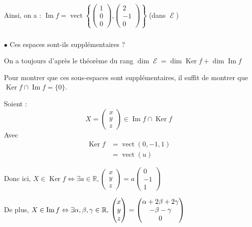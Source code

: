\documentclass[a4paper,12pt]{article}
\DeclareMathOperator{\Ker}{Ker}
\DeclareMathOperator{\Img}{Im}
\DeclareMathOperator{\vect}{vect}
\DeclareMathOperator{\E}{\mathcal{E}}
\DeclareMathOperator{\di}{dim}
\begin{document}
    Ainsi, on a : $\Img f=\vect\left\{\begin{pmatrix}1\\0\\0\end{pmatrix}\mbox{,}\begin{pmatrix}2\\-1\\0\end{pmatrix}\right\}$ (dans $\E$)

\subsubsection{}

$\bullet$ Ces espaces sont-ils supplémentaires ?

On a toujours d'après le théorème du rang $\di \E = \di \Ker f + \di \Img f$

Pour montrer que ces sous-espaces sont supplémentaires, il suffit de montrer que $\Ker f\cap\Img f=\{0\}$.

Soient :
$$X=\begin{pmatrix}x\\y\\z\end{pmatrix}\in\Img f\cap\Ker f$$
Avec \begin{align*}
        \Ker f&=\vect(0,-1,1) \\
        &=\vect(u)
    \end{align*}

Donc ici, $X\in\Ker f\Leftrightarrow \exists a \in \mathbb{R},\begin{pmatrix}x\\y\\z\end{pmatrix}=a\begin{pmatrix}0\\-1\\1\end{pmatrix}$

De plus, $X\in\Img f\Leftrightarrow \exists \alpha,\beta,\gamma \in \mathbb{R},\\
\begin{pmatrix}x\\y\\z\end{pmatrix}=\begin{pmatrix}\alpha+2\beta+2\gamma\\-\beta-\gamma\\0\end{pmatrix}$
\end{document}
